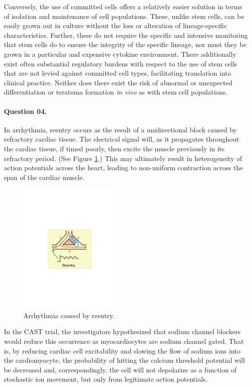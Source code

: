 \documentclass[11pt,letterpaper,final] {article}
\begin{document}
Conversely, the use of committed cells offers a relatively easier solution in terms of isolation and maintenance of cell populations. These, unlike stem cells, can be easily grown out in culture without the loss or alteration of lineage-specific characteristics. Further, these do not require the specific and intensive monitoring that stem cells do to ensure the integrity of the specific lineage, nor must they be grown in a particular and expensive cytokine environment. There additionally exist often substantial regulatory burdens with respect to the use of stem cells that are not levied against committed cell types, facilitating translation into clinical practice. Neither does there exist the risk of abnormal or unexpected differentiation or teratoma formation \textit{in vivo} as with stem cell populations.

\paragraph{Question 04.} In arrhythmia, reentry occurs as the result of a unidirectional block caused by refractory cardiac tissue. The electrical signal will, as it propagates throughout the cardiac tissue, if timed poorly, then excite the muscle previously in its refractory period. (See Figure \ref{fig:00}.) This may ultimately result in heterogeneity of action potentials across the heart, leading to non-uniform contraction across the span of the cardiac muscle.

\begin{figure}[htp]
  \centering
    \includegraphics[width=0.45\textwidth]{reentry}
	\caption{Arrhythmia caused by reentry.}
	\label{fig:00}
\end{figure}

In the CAST trial, the investigators hypothesized that sodium channel blockers would reduce this occurrence as myocardiocytes are sodium channel gated. That is, by reducing cardiac cell excitability and slowing the flow of sodium ions into the cardiomyocyte,  the probability of hitting the calcium threshold potential will be decreased and, correspondingly, the cell will not depolarize as a function of stochastic ion movement, but only from legitimate action potentials.
\end{document}
